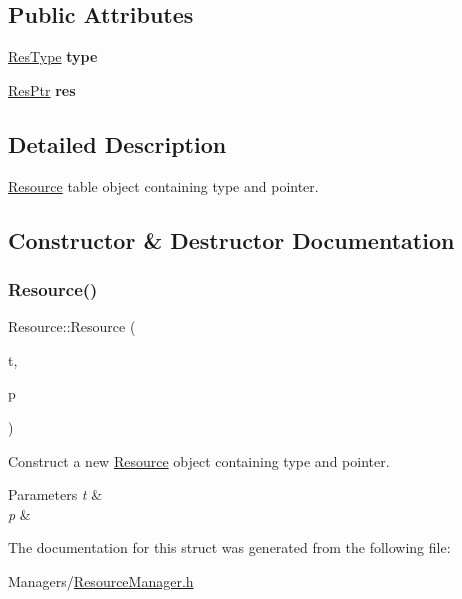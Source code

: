 \subsection*{Public Attributes}
\begin{DoxyCompactItemize}
\item 
\mbox{\label{structResource_a111f61bea2f7357f789222df96d63fdc}} 
\hyperlink{ResourceManager_8h_af056974bdbbf81e99a9d58e34c88c7fa}{Res\+Type} {\bfseries type}
\item 
\mbox{\label{structResource_afb207229813188f8caf0efb1242fc55b}} 
\hyperlink{unionResPtr}{Res\+Ptr} {\bfseries res}
\end{DoxyCompactItemize}


\subsection{Detailed Description}
\hyperlink{structResource}{Resource} table object containing type and pointer. 

\subsection{Constructor \& Destructor Documentation}
\mbox{\label{structResource_a6fad5982974fff2c2c9110370bc95091}} 
\subsubsection{\texorpdfstring{Resource()}{Resource()}}
{\footnotesize\ttfamily Resource\+::\+Resource (\begin{DoxyParamCaption}\item[{\hyperlink{ResourceManager_8h_af056974bdbbf81e99a9d58e34c88c7fa}{Res\+Type}}]{t,  }\item[{\hyperlink{unionResPtr}{Res\+Ptr}}]{p }\end{DoxyParamCaption})\hspace{0.3cm}{\ttfamily [inline]}}



Construct a new \hyperlink{structResource}{Resource} object containing type and pointer. 


\begin{DoxyParams}{Parameters}
{\em t} & \\
\hline
{\em p} & \\
\hline
\end{DoxyParams}


The documentation for this struct was generated from the following file\+:\begin{DoxyCompactItemize}
\item 
Managers/\hyperlink{ResourceManager_8h}{Resource\+Manager.\+h}\end{DoxyCompactItemize}
